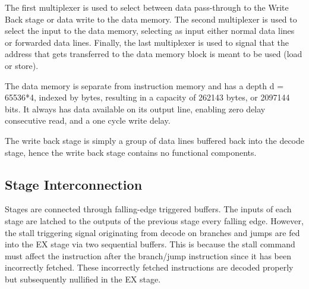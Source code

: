 \documentclass[12pt]{IEEEtran} %
\begin{document}
The first multiplexer is used to select between data pass-through to the Write Back stage or data write to the data memory. The second multiplexer is used to select the input to the data memory, selecting as input either normal data lines or forwarded data lines. Finally, the last multiplexer is used to signal that the address that gets transferred to the data memory block is meant to be used (load or store).

The data memory is separate from instruction memory and has a depth d = 65536*4, indexed by bytes, resulting in a capacity of 262143 bytes, or 2097144 bits. It always has data available on its output line, enabling zero delay consecutive read, and a one cycle write delay.

The write back stage is simply a group of data lines buffered back into the decode stage, hence the write back stage contains no functional components. 


\subsection{Stage Interconnection} %
\label{sub:stage_interconnection}
Stages are connected through falling-edge triggered buffers. The inputs of each stage are latched to the outputs of the previous stage every falling edge. However, the stall triggering signal originating from decode on branches and jumps are fed into the EX stage via two sequential buffers. This is because the stall command must affect the instruction after the branch/jump instruction since it has been incorrectly fetched. These incorrectly fetched instructions are decoded properly but subsequently nullified in the EX stage.
\end{document}
